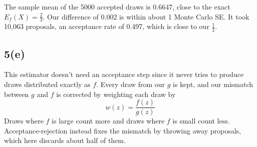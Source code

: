 \documentclass[11pt]{article}
\begin{document}
The sample mean of the 5000 accepted draws is 0.6647, close to the exact $E_f(X) = \frac{2}{3}$. Our difference of 0.002 is within about 1 Monte Carlo SE. It took 10,063 proposals, an acceptance rate of 0.497, which is close to our $\frac{1}{2}$.

\subsection*{5(e)}
This estimator doesn't need an acceptance step since it never tries to produce draws distributed exactly as $f$. Every draw from our $g$ is kept, and our mismatch between $g$ and $f$ is corrected by weighting each draw by
\[
w(z) = \frac{f(z)}{g(z)}
\]
Draws where $f$ is large count more and draws where $f$ is small count less. Acceptance-rejection instead fixes the mismatch by throwing away proposals, which here discards about half of them.
\end{document}
